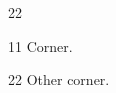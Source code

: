\documentclass[paper=A4]{ropas-poster}
\begin{document}
\begin{postergrid}{2}{2}
\begin{posterblock}{1}{1}
Corner.
\end{posterblock}
\begin{posterblock}{2}{2}
Other corner.
\end{posterblock}
\end{postergrid}
\end{document}
